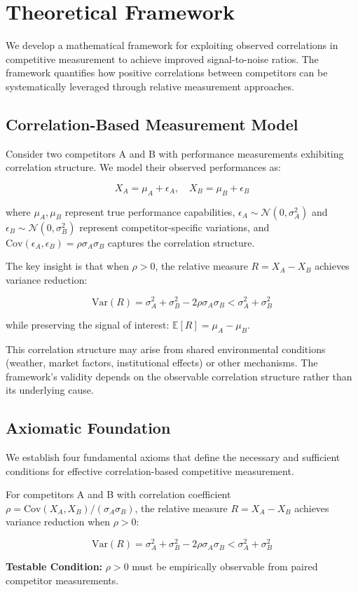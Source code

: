\section{Theoretical Framework}

We develop a mathematical framework for exploiting observed correlations in competitive measurement to achieve improved signal-to-noise ratios. The framework quantifies how positive correlations between competitors can be systematically leveraged through relative measurement approaches.

\subsection{Correlation-Based Measurement Model}

Consider two competitors A and B with performance measurements exhibiting correlation structure. We model their observed performances as:

$$X_A = \mu_A + \epsilon_A, \quad X_B = \mu_B + \epsilon_B$$

where $\mu_A, \mu_B$ represent true performance capabilities, $\epsilon_A \sim \mathcal{N}(0, \sigma_A^2)$ and $\epsilon_B \sim \mathcal{N}(0, \sigma_B^2)$ represent competitor-specific variations, and $\text{Cov}(\epsilon_A, \epsilon_B) = \rho\sigma_A\sigma_B$ captures the correlation structure.

The key insight is that when $\rho > 0$, the relative measure $R = X_A - X_B$ achieves variance reduction:

$$\text{Var}(R) = \sigma_A^2 + \sigma_B^2 - 2\rho\sigma_A\sigma_B < \sigma_A^2 + \sigma_B^2$$

while preserving the signal of interest: $\mathbb{E}[R] = \mu_A - \mu_B$.

This correlation structure may arise from shared environmental conditions (weather, market factors, institutional effects) or other mechanisms. The framework's validity depends on the observable correlation structure rather than its underlying cause.

\subsection{Axiomatic Foundation}

We establish four fundamental axioms that define the necessary and sufficient conditions for effective correlation-based competitive measurement.

\begin{axiom}
For competitors A and B with correlation coefficient $\rho = \text{Cov}(X_A, X_B)/(\sigma_A \sigma_B)$, the relative measure $R = X_A - X_B$ achieves variance reduction when $\rho > 0$:

$$\text{Var}(R) = \sigma_A^2 + \sigma_B^2 - 2\rho\sigma_A\sigma_B < \sigma_A^2 + \sigma_B^2$$

\textbf{Testable Condition:} $\rho > 0$ must be empirically observable from paired competitor measurements.
\end{axiom}

